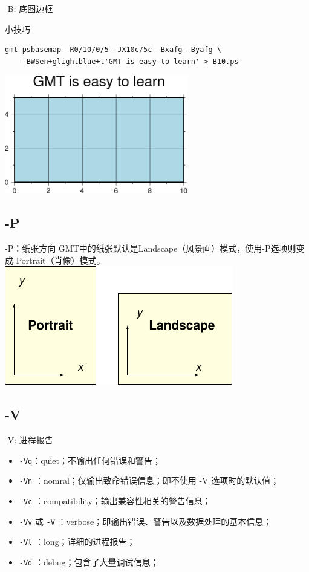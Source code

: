 \documentclass[UTF8, 11pt]{ctexbeamer}
\begin{document}
\begin{frame}[fragile]{-B: 底图边框}
\begin{block}{小技巧}
\centering
\small\begin{verbatim}
gmt psbasemap -R0/10/0/5 -JX10c/5c -Bxafg -Byafg \
    -BWSen+glightblue+t'GMT is easy to learn' > B10.ps
\end{verbatim}
\includegraphics[width=0.6\textwidth]{GMT_B_example_10}
\end{block}
\end{frame}

\subsection{-P}
\begin{frame}{-P：纸张方向}
GMT中的纸张默认是Landscape（风景画）模式，使用-P选项则变成 Portrait（肖像）模式。
\centering
\includegraphics[width=\textwidth]{GMT_-P}
\end{frame}

\subsection{-V}
\begin{frame}[fragile]{-V: 进程报告}
\begin{itemize}
\item \verb|-Vq|：quiet；不输出任何错误和警告；
\item \verb|-Vn| ：nomral；仅输出致命错误信息；即不使用 -V 选项时的默认值；
\item \verb|-Vc| ：compatibility；输出兼容性相关的警告信息；
\item \verb|-Vv| 或 \verb|-V| ：verbose；即输出错误、警告以及数据处理的基本信息；
\item \verb|-Vl| ：long；详细的进程报告；
\item \verb|-Vd| ：debug；包含了大量调试信息；
\end{itemize}
\end{frame}
\end{document}
